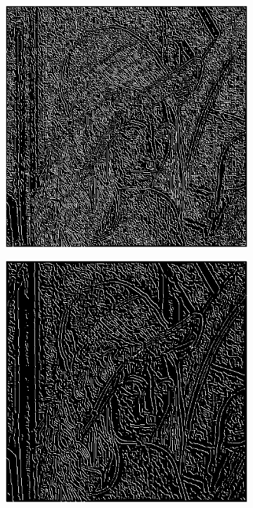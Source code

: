 \documentclass[a4paper]{article}
\begin{document}
\begin{figure}[h]

\begin{subfigure}{0.33\textwidth}
\includegraphics[width=\textwidth]{img/sigma1/lenanon.png}
\end{subfigure}
\begin{subfigure}{0.33\textwidth}
\includegraphics[width=\textwidth]{img/sigma2/lenanon.png}

\end{subfigure}
\end{figure}
\end{document}

